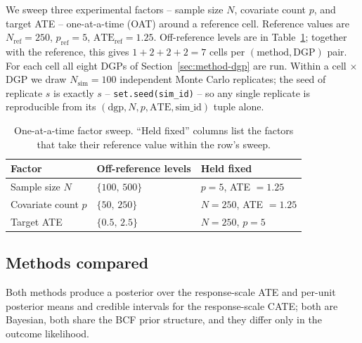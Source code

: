 \documentclass[11pt]{article}
\theoremstyle{plain}
\theoremstyle{definition}
\theoremstyle{remark}
\begin{document}
We sweep three experimental factors -- sample size $N$, covariate
count $p$, and target ATE -- one-at-a-time (OAT) around a reference
cell. Reference values are $N_{\mathrm{ref}} = 250$,
$p_{\mathrm{ref}} = 5$, $\mathrm{ATE}_{\mathrm{ref}} = 1.25$.
Off-reference levels are in Table~\ref{tab:method-factors}; together
with the reference, this gives $1 + 2 + 2 + 2 = 7$ cells per
$(\text{method}, \text{DGP})$ pair. For each cell all eight DGPs of
Section~\ref{sec:method-dgp} are run. Within a cell $\times$ DGP we
draw $N_{\mathrm{sim}} = 100$ independent Monte Carlo replicates;
the seed of replicate $s$ is exactly $s$ -- \verb|set.seed(sim_id)| --
so any single replicate is reproducible from its
$(\text{dgp}, N, p, \text{ATE}, \text{sim\_id})$ tuple alone.

\begin{table}[t]
\centering
\caption{One-at-a-time factor sweep. ``Held fixed'' columns list the
factors that take their reference value within the row's sweep.}
\label{tab:method-factors}
\begin{tabular}{lll}
\toprule
Factor & Off-reference levels & Held fixed \\
\midrule
Sample size $N$         & $\{100,\, 500\}$       & $p = 5$,\; ATE $= 1.25$ \\
Covariate count $p$     & $\{50,\, 250\}$        & $N = 250$,\; ATE $= 1.25$ \\
Target ATE              & $\{0.5,\, 2.5\}$       & $N = 250$,\; $p = 5$ \\
\bottomrule
\end{tabular}
\end{table}

\subsection{Methods compared}\label{sec:method-methods}

Both methods produce a posterior over the response-scale ATE and
per-unit posterior means and credible intervals for the
response-scale CATE; both are Bayesian, both share the BCF prior
structure, and they differ only in the outcome likelihood.
\end{document}
